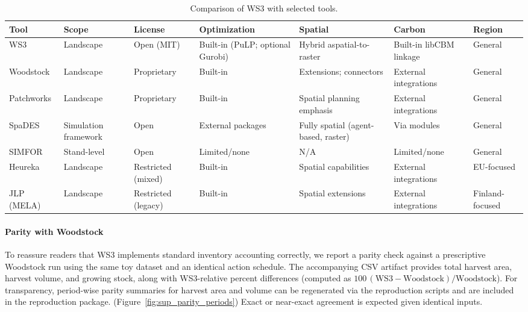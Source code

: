 \documentclass[review]{elsarticle}
\begin{document}
\begin{table}[h]
  \centering
  \caption{Comparison of WS3 with selected tools.}
  \begingroup
  \setlength{\tabcolsep}{3pt}
  \renewcommand{\arraystretch}{0.92}
  \footnotesize
  \begin{tabular}{p{2.4cm}p{2.1cm}p{1.5cm}p{2.0cm}p{2.0cm}p{1.9cm}p{1.9cm}}
  \toprule
  Tool & Scope & License & Optimization & Spatial & Carbon & Region \\
  \midrule
  WS3 & Landscape & Open (MIT) & Built-in (PuLP; optional Gurobi) & Hybrid aspatial-to-raster & Built-in libCBM linkage & General \\
  Woodstock & Landscape & Proprietary & Built-in & Extensions; connectors & External integrations & General \\
  Patchworks & Landscape & Proprietary & Built-in & Spatial planning emphasis & External integrations & General \\
  SpaDES & Simulation framework & Open & External packages & Fully spatial (agent-based, raster) & Via modules & General \\
  SIMFOR & Stand-level & Open & Limited/none & N/A & Limited/none & General \\
  Heureka & Landscape & Restricted (mixed) & Built-in & Spatial capabilities & External integrations & EU-focused \\
  JLP (MELA) & Landscape & Restricted (legacy) & Built-in & Spatial extensions & External integrations & Finland-focused \\
  \bottomrule
  \end{tabular}
  \endgroup
\end{table}

\paragraph{Parity with Woodstock}
To reassure readers that WS3 implements standard inventory accounting correctly, we report a parity check against a prescriptive Woodstock run using the same toy dataset and an identical action schedule. The accompanying CSV artifact  provides total harvest area, harvest volume, and growing stock, along with WS3-relative percent differences (computed as $100\,(\mathrm{WS3{-}Woodstock})/\mathrm{Woodstock}$). For transparency, period-wise parity summaries for harvest area and volume can be regenerated via the reproduction scripts and are included in the reproduction package. (Figure~\ref{fig:sup_parity_periods}) Exact or near-exact agreement is expected given identical inputs.
\end{document}

